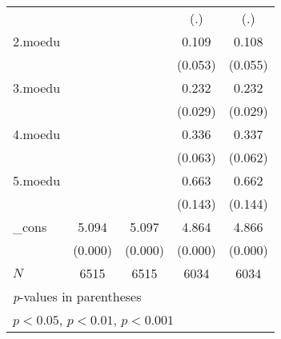 {\begin{tabular}{l*{4}{c}}
            &                     &                     &         (.)         &         (.)         \\
[1em]
2.moedu     &                     &                     &       0.109         &       0.108         \\
            &                     &                     &     (0.053)         &     (0.055)         \\
[1em]
3.moedu     &                     &                     &       0.232\sym{*}  &       0.232\sym{*}  \\
            &                     &                     &     (0.029)         &     (0.029)         \\
[1em]
4.moedu     &                     &                     &       0.336         &       0.337         \\
            &                     &                     &     (0.063)         &     (0.062)         \\
[1em]
5.moedu     &                     &                     &       0.663         &       0.662         \\
            &                     &                     &     (0.143)         &     (0.144)         \\
[1em]
\_cons      &       5.094\sym{***}&       5.097\sym{***}&       4.864\sym{***}&       4.866\sym{***}\\
            &     (0.000)         &     (0.000)         &     (0.000)         &     (0.000)         \\
\hline
\(N\)       &        6515         &        6515         &        6034         &        6034         \\
\hline\hline
\multicolumn{5}{l}{\footnotesize \textit{p}-values in parentheses}\\
\multicolumn{5}{l}{\footnotesize \sym{*} \(p<0.05\), \sym{**} \(p<0.01\), \sym{***} \(p<0.001\)}\\
\end{tabular}
}

